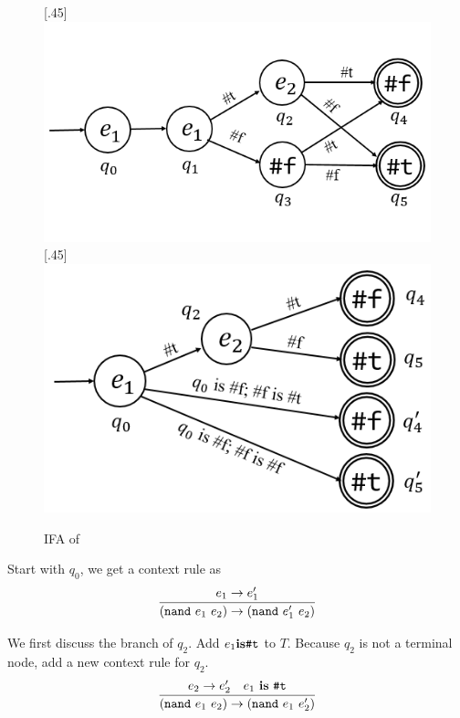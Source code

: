 \begin{figure}[t]
\centering
{}[.45\linewidth]{
    \includegraphics[scale=0.28]{images/ifa/ifa-nand-4.png}
}
[.45\linewidth]{
    \includegraphics[scale=0.28]{images/ifa/ifa-nand.png}
}
\caption{IFA of }
\label{fig:ifa-nand-std}
\end{figure}

Start with $q_0$, we get a context rule as
\[
\infer{(\m{nand}~e_1~e_2) \to (\m{nand}~e_1'~e_2)}{e_1 \to e_1'}
\]

We first discuss the branch of $q_2$. Add $e_1 \mbox{\rm \bf is} \mbox{\tt \#t}$ to $T$. Because $q_2$ is not a terminal node, add a new context rule for $q_2$.
\[
\infer{(\m{nand}~e_1~e_2) \to (\m{nand}~e_1~e_2')}{e_2 \to e_2'\quad e_1~\key{is}~\m{\#t}}
\]


